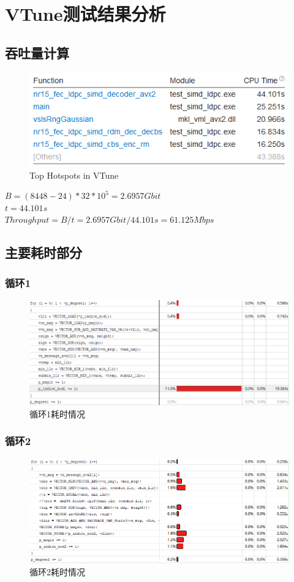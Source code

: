 \documentclass{article}
\begin{document}
\section{VTune测试结果分析}
\subsection{吞吐量计算}
\begin{figure}[H]
	\centering
	\includegraphics[width = .8\textwidth]{res.png}
	\caption{Top Hotspots in VTune}
\end{figure}
$B=(8448-24)*32*10^5=2.6957Gbit$\\
$t=44.101s$\\
$Throughput=B/t=2.6957Gbit/44.101s=61.125Mbps$

\subsection{主要耗时部分}
\subsubsection{循环1}
\begin{figure}[H]
	\centering
	\includegraphics[width = .8\textwidth]{loop1.png}
	\caption{循环1耗时情况}
\end{figure}
\subsubsection{循环2}
\begin{figure}[H]
	\centering
	\includegraphics[width = .8\textwidth]{loop2.png}
	\caption{循环2耗时情况}
\end{figure}
\end{document}
